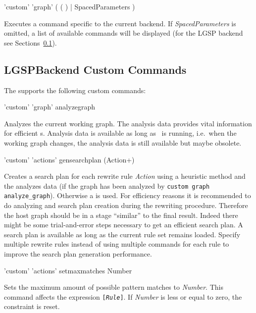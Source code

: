 \begin{rail}
  'custom' 'graph' ( ( ) | SpacedParameters )
\end{rail}
Executes a command specific to the current backend.
If \emph{SpacedParameters} is omitted, a list of available commands will be displayed (for the LGSP backend see Sections~\ref{custom}).


\subsection{LGSPBackend Custom Commands}
\label{custom}

The  supports the following custom commands:

\begin{rail}
  'custom' 'graph' analyzegraph
\end{rail}
Analyzes the current working graph.
The analysis data provides vital information for efficient s.
Analysis data is available as long as \GrShell\ is running, i.e.\ when the working graph changes, the analysis data is still available but maybe obsolete.

\begin{rail}
  'custom' 'actions' gensearchplan (Action+)
\end{rail}
Creates a search plan for each rewrite rule \emph{Action} using a heuristic method and the analyzes data (if the graph has been analyzed by \texttt{custom graph analyze\_graph}).
Otherwise a  is used.
For efficiency reasons it is recommended to do analyzing and search plan creation during the rewriting procedure.
Therefore the host graph should be in a stage ``similar'' to the final result.
Indeed there might be some trial-and-error steps necessary to get an efficient search plan.
A search plan is available as long as the current rule set remains loaded. 
Specify multiple rewrite rules instead of using multiple commands for each rule to improve the search plan generation performance.

\begin{rail}
  'custom' 'actions' setmaxmatches Number
\end{rail}
Sets the maximum amount of possible pattern matches to \emph{Number}.
This command affects the expression \texttt{[\emph{Rule}]}.
If \emph{Number} is less or equal to zero, the constraint is reset.

